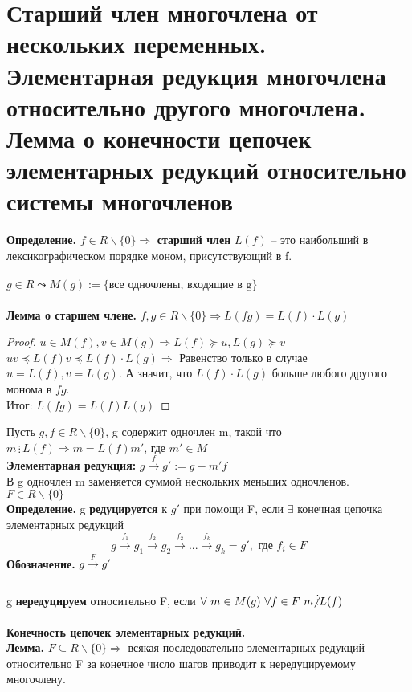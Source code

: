 \section{Старший член многочлена от нескольких переменных. Элементарная редукция многочлена относительно другого многочлена. Лемма о конечности цепочек элементарных редукций относительно системы многочленов}

\textbf{Определение.} $f\in R\backslash\{0\}\Rightarrow$ \textbf{старший член} $L(f)$ -- это наибольший в лексикографическом порядке моном, присутствующий в f.\\
\\
$g\in R\leadsto M(g):=\{\text{все одночлены, входящие в g}\}$\\\\
\textbf{Лемма о старшем члене.} $f,g\in R\backslash\{0\}\Rightarrow L(fg)=L(f)\cdot L(g)$
\begin{proof}
    $u\in M(f), v\in M(g)\Rightarrow L(f)\succcurlyeq u, L(g)\succcurlyeq v$\\
    $uv\preccurlyeq L(f)v\preccurlyeq L(f)\cdot L(g)\Rightarrow$ Равенство только в случае $u=L(f), v=L(g)$. А значит, что $L(f)\cdot L(g)$ больше любого другого монома в $fg$.\\
    Итог: $L(fg)=L(f)L(g)$
\end{proof}
\noindent Пусть $g,f\in R\backslash\{0\}$, g содержит одночлен m, такой что $m\,\vdots\, L(f)\Rightarrow m=L(f)m'$, где $m'\in M$\\
\textbf{Элементарная редукция:} $g\overset{f}{\rightarrow}g':=g-m'f$\\
В g одночлен m заменяется суммой нескольких меньших одночленов.\\
$F\in R\backslash\{0\}$\\
\textbf{Определение.} g \textbf{редуцируется} к $g'$ при помощи F, если $\exists$ конечная цепочка элементарных редукций \\
$$g\overset{f_1}{\rightarrow}g_1\overset{f_2}{\rightarrow}g_2\overset{f_2}{\rightarrow}...\overset{f_k}{\rightarrow}g_k=g',\text{ где } f_i\in F $$
\textbf{Обозначение.} $g\overset{F}{\rightarrow}g'$\\\\
g \textbf{нередуцируем} относительно F, если $\forall \ m\in M(g)\ \forall f\in F\ m\!\!\not\vdots L(f)$\\\\
\textbf{Конечность цепочек элементарных редукций.}\\
\textbf{Лемма.} $F\subseteq R\backslash\{0\}\Rightarrow$ всякая последовательно элементарных редукций относительно F за конечное число шагов приводит к нередуцируемому многочлену.\\
